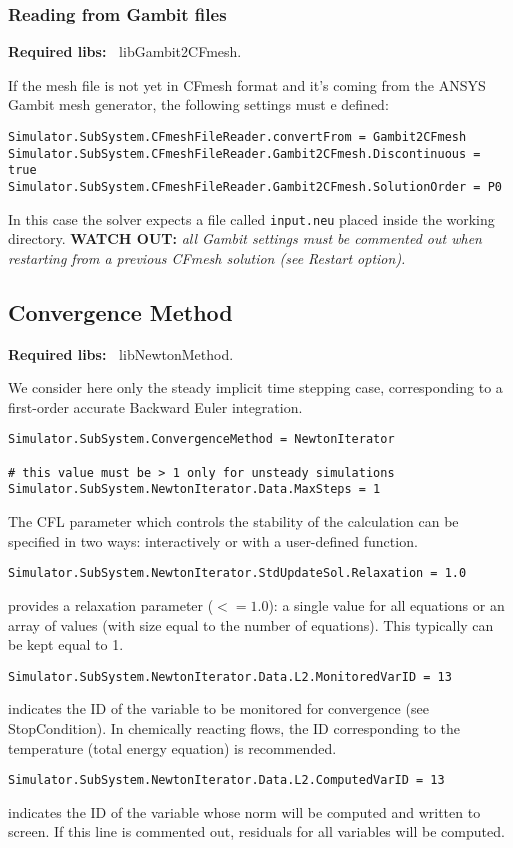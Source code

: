 \documentclass[11pt]{article}
\begin{document}
\subsubsection{Reading from Gambit files}

{\bf Required libs:~} libGambit2CFmesh.

If the mesh file is not yet in CFmesh format and it's coming from the ANSYS Gambit mesh generator,
the following settings must e defined:  

\begin{verbatim}
Simulator.SubSystem.CFmeshFileReader.convertFrom = Gambit2CFmesh
Simulator.SubSystem.CFmeshFileReader.Gambit2CFmesh.Discontinuous = true
Simulator.SubSystem.CFmeshFileReader.Gambit2CFmesh.SolutionOrder = P0
\end{verbatim}
In this case the solver expects a file called {\tt input.neu} placed inside the working directory.
{\bf WATCH OUT:} {\it all Gambit settings must be commented out when restarting from a previous CFmesh solution 
  (see Restart option).}

\subsection{Convergence Method}

{\bf Required libs:~} libNewtonMethod.

We consider here only the steady implicit time stepping case, corresponding to a first-order accurate 
Backward Euler integration.

\begin{verbatim}
Simulator.SubSystem.ConvergenceMethod = NewtonIterator

# this value must be > 1 only for unsteady simulations
Simulator.SubSystem.NewtonIterator.Data.MaxSteps = 1
\end{verbatim}
The CFL parameter which controls the stability of the calculation can be specified in two ways: 
interactively or with a user-defined function.

\begin{verbatim}
Simulator.SubSystem.NewtonIterator.StdUpdateSol.Relaxation = 1.0
\end{verbatim}
provides a relaxation parameter ($<= 1.0$): a single value for all equations or an array of values (with size equal to the number of equations).
This typically can be kept equal to 1.

\begin{verbatim}
Simulator.SubSystem.NewtonIterator.Data.L2.MonitoredVarID = 13
\end{verbatim}
indicates the ID of the variable to be monitored for convergence (see StopCondition). In chemically reacting flows, 
the ID corresponding to the temperature (total energy equation) is recommended.
\begin{verbatim}
Simulator.SubSystem.NewtonIterator.Data.L2.ComputedVarID = 13
\end{verbatim}
indicates the ID of the variable whose norm will be computed and written to screen. If this line is commented out, residuals 
for all variables will be computed.
\end{document}

